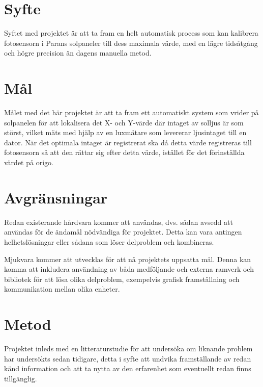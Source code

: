 \documentclass[a4paper, 12pt]{article}
\begin{document}


\section{Syfte} %
\label{sec:syfte}
    Syftet med projektet är att ta fram en helt automatisk process som kan kalibrera fotosensorn i Parans solpaneler till dess maximala värde, med en lägre tidsåtgång och högre precision än dagens manuella metod.


\section{Mål} %
\label{sec:m_l}

    Målet med det här projektet är att ta fram ett automatiskt system som vrider på solpanelen för att lokalisera det X- och Y-värde där intaget av solljus är som störst, vilket mäts med hjälp av en luxmätare som levererar ljusintaget till en dator. När det optimala intaget är registrerat ska då detta värde registreras till fotosensorn så att den rättar sig efter detta värde, istället för det förinställda värdet på origo. 


\section{Avgränsningar} %
\label{sec:avgr_nsningar}
    Redan existerande hårdvara kommer att användas, dvs. sådan avsedd att användas för de ändamål nödvändiga för projektet. Detta kan vara antingen helhetslösningar eller sådana som löser delproblem och kombineras. \bigskip

    Mjukvara kommer att utvecklas för att nå projektets uppsatta mål. Denna kan komma att inkludera användning av båda medföljande och externa ramverk och bibliotek för att lösa olika delproblem, exempelvis grafisk framställning och kommunikation mellan olika enheter.


\section{Metod}
\label{sec:metod} %
    Projektet inleds med en litteraturstudie för att undersöka om liknande problem har undersökts sedan tidigare, detta i syfte att undvika framställande av redan känd information och att ta nytta av den erfarenhet som eventuellt redan finns tillgänglig. \bigskip
\end{document}
